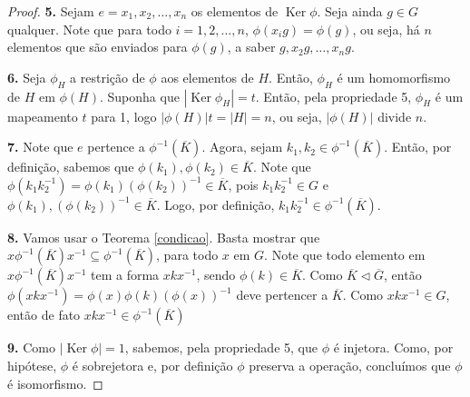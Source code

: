 \documentclass[a4paper,portuguese,11pt,twoside, leqno]{book}
\DeclareMathOperator{\Ker}{Ker}
\theoremstyle{definition}
\begin{document}
\begin{proof}
		\par\vspace{0.3cm}\hspace{17pt}\textbf{5.} Sejam $ e = x_1, x_2, \dots, x_n$ os elementos de $\Ker\phi$. Seja ainda $g\in G$ qualquer. Note que para todo $i = 1, 2, \dots, n$, $\phi(x_ig) = \phi(g)$, ou seja, há $n$ elementos que são enviados para $\phi(g)$, a saber $g, x_2g, \dots, x_ng$.
		
		\par\vspace{0.3cm}\hspace{17pt}\textbf{6.} Seja $\phi_H$ a restrição de $\phi$ aos elementos de $H$. Então, $\phi_H$ é um homomorfismo de $H$ em $\phi(H)$. Suponha que $|\Ker\phi_H| = t$. Então, pela propriedade 5, $\phi_H$ é um mapeamento $t$ para 1, logo $|\phi(H)|t = |H| = n$, ou seja, $|\phi(H)|$ divide $n$.
		
		\par\vspace{0.3cm}\hspace{17pt}\textbf{7.} Note que $e$ pertence a $\phi^{-1}(\overline{K})$. Agora, sejam $k_1, k_2\in \phi^{-1}(\overline{K})$. Então, por definição, sabemos que $\phi(k_1), \phi(k_2)\in\overline{K}$. Note que $\phi(k_1k_2^{-1}) = \phi(k_1)(\phi(k_2))^{-1}\in\overline{K}$, pois $k_1k_2^{-1}\in G$ e $\phi(k_1),(\phi(k_2))^{-1}\in\overline{K}$. Logo, por definição, $k_1k_2^{-1}\in\phi^{-1}(\overline{K})$. 	
		
		\par\vspace{0.3cm}\hspace{17pt}\textbf{8.} Vamos usar o Teorema \eqref{condicao}. Basta mostrar que $x\phi^{-1}(\overline{K})x^{-1}\subseteq\phi^{-1}(\overline{K})$, para todo $x$ em $G$. Note que todo elemento em $x\phi^{-1}(\overline{K})x^{-1}$ tem a forma $xkx^{-1}$, sendo $\phi(k)\in\overline{K}$. Como $\overline{K}\vartriangleleft\overline{G}$, então $\phi(xkx^{-1}) = \phi(x)\phi(k)(\phi(x))^{-1}$ deve pertencer a $\overline{K}$. Como $xkx^{-1}\in G$, então de fato $xkx^{-1}\in\phi^{-1}(\overline{K})$
		
		\par\vspace{0.3cm}\hspace{17pt}\textbf{9.} Como $|\Ker\phi| = 1$, sabemos, pela propriedade 5, que $\phi$ é injetora. Como, por hipótese, $\phi$ é sobrejetora e, por definição $\phi$ preserva a operação, concluímos que $\phi$ é isomorfismo.
		
	\end{proof}
	
\end{document}
